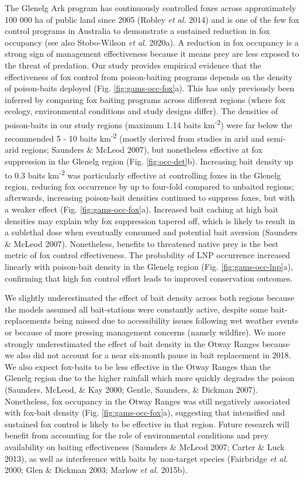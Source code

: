 \documentclass[11pt,a4paper,titlepage,twoside,openright]{style/unimelbthesis}
\begin{document}
\begin{mainmatter}
The Glenelg Ark program has continuously controlled foxes across approximately 100 000 ha of public land since 2005 (Robley \emph{et al.} 2014) and is one of the few fox control programs in Australia to demonstrate a sustained reduction in fox occupancy (see also Stobo-Wilson \emph{et al.} 2020a). A reduction in fox occupancy is a strong sign of management effectiveness because it means prey are less exposed to the threat of predation. Our study provides empirical evidence that the effectiveness of fox control from poison-baiting programs depends on the density of poison-baits deployed (Fig. \ref{fig:gams-occ-fox}a). This has only previously been inferred by comparing fox baiting programs across different regions (where fox ecology, environmental conditions and study designs differ). The densities of poison-baits in our study regions (maximum 1.14 baits km\textsuperscript{-2}) were far below the recommended 5 - 10 baits km\textsuperscript{-2} (mostly derived from studies in arid and semi-arid regions; Saunders \& McLeod 2007), but nonetheless effective at fox suppression in the Glenelg region (Fig. \ref{fig:occ-det}b). Increasing bait density up to 0.3 baits km\textsuperscript{-2} was particularly effective at controlling foxes in the Glenelg region, reducing fox occurrence by up to four-fold compared to unbaited regions; afterwards, increasing poison-bait densities continued to suppress foxes, but with a weaker effect (Fig. \ref{fig:gams-occ-fox}a). Increased bait caching at high bait densities may explain why fox suppression tapered off, which is likely to result in a sublethal dose when eventually consumed and potential bait aversion (Saunders \& McLeod 2007). Nonetheless, benefits to threatened native prey is the best metric of fox control effectiveness. The probability of LNP occurrence increased linearly with poison-bait density in the Glenelg region (Fig. \ref{fig:gams-occ-lnp}a), confirming that high fox control effort leads to improved conservation outcomes.

We slightly underestimated the effect of bait density across both regions because the models assumed all bait-stations were constantly active, despite some bait-replacements being missed due to accessibility issues following wet weather events or because of more pressing management concerns (namely wildfire). We more strongly underestimated the effect of bait density in the Otway Ranges because we also did not account for a near six-month pause in bait replacement in 2018. We also expect fox-baits to be less effective in the Otway Ranges than the Glenelg region due to the higher rainfall which more quickly degrades the poison (Saunders, McLeod, \& Kay 2000; Gentle, Saunders, \& Dickman 2007). Nonetheless, fox occupancy in the Otway Ranges was still negatively associated with fox-bait density (Fig. \ref{fig:gams-occ-fox}a), suggesting that intensified and sustained fox control is likely to be effective in that region. Future research will benefit from accounting for the role of environmental conditions and prey availability on baiting effectiveness (Saunders \& McLeod 2007; Carter \& Luck 2013), as well as interference with baits by non-target species (Fairbridge \emph{et al.} 2000; Glen \& Dickman 2003; Marlow \emph{et al.} 2015b).


\end{mainmatter}
\end{document}
